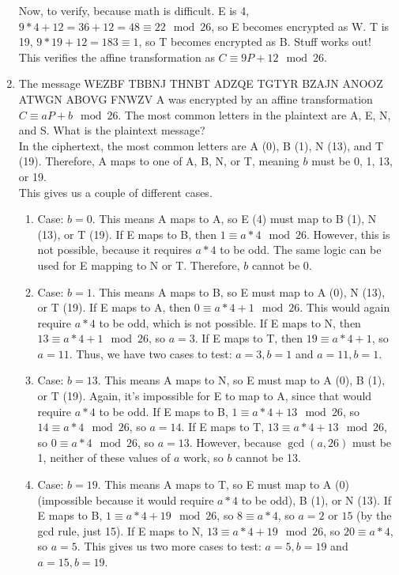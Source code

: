 \documentclass{article}
\begin{document}
\begin{enumerate}
          Now, to verify, because math is difficult. E is 4, $9*4 + 12 = 36 + 12 = 48 \equiv 22 \mod{26}$, so E becomes encrypted as W. T is 19, $9 * 19 + 12 = 183 \equiv 1$, so T becomes encrypted as B. Stuff works out!\\
          This verifies the affine transformation as $C \equiv 9P + 12 \mod{26}$.
    \item The message WEZBF TBBNJ THNBT ADZQE TGTYR BZAJN ANOOZ ATWGN ABOVG FNWZV A was encrypted by an affine transformation $C \equiv aP +b \mod{26}$. The most common letters in the plaintext are A, E, N, and S. What is the plaintext message?\\
          In the ciphertext, the most common letters are A (0), B (1), N (13), and T (19). Therefore, A maps to one of A, B, N, or T, meaning $b$ must be 0, 1, 13, or 19.\\
          This gives us a couple of different cases.\\
          \begin{enumerate}
              \item Case: $b = 0$. This means A maps to A, so E (4) must map to B (1), N (13), or T (19). If E maps to B, then $1 \equiv a*4 \mod 26$. However, this is not possible, because it requires $a*4$ to be odd. The same logic can be used for E mapping to N or T. Therefore, $b$ cannot be $0$.
              \item Case: $b = 1$. This means A maps to B, so E must map to A (0), N (13), or T (19). If E maps to A, then $0 \equiv a * 4 + 1 \mod{26}$. This would again require $a*4$ to be odd, which is not possible. If E maps to N, then $13 \equiv a * 4 + 1 \mod{26}$, so $a = 3$. If E maps to T, then $19 \equiv a*4 + 1$, so $a = 11$. Thus, we have two cases to test: $a = 3, b = 1$ and $a = 11, b = 1$.
              \item Case: $b = 13$. This means A maps to N, so E must map to A (0), B (1), or T (19). Again, it's impossible for E to map to A, since that would require $a*4$ to be odd. If E maps to B, $1 \equiv a*4 + 13 \mod{26}$, so $14 \equiv a*4 \mod{26}$, so $a = 14$. If E maps to T, $13 \equiv a*4 + 13 \mod{26}$, so $0 \equiv a*4 \mod{26}$, so $a = 13$. However, because $\gcd(a, 26)$ must be 1, neither of these values of $a$ work, so $b$ cannot be 13.
              \item Case: $b = 19$. This means A maps to T, so E must map to A (0) (impossible because it would require $a*4$ to be odd), B (1), or N (13). If E maps to B, $1 \equiv a*4 +19 \mod{26}$, so $8 \equiv a*4$, so $a = 2 \text{ or } 15$ (by the gcd rule, just 15). If E maps to N, $13 \equiv a*4 + 19 \mod{26}$, so $20 \equiv a*4$, so $a=5$. This gives us two more cases to test: $a = 5, b = 19$ and $a = 15, b = 19$.

\end{enumerate}
\end{enumerate}
\end{document}
